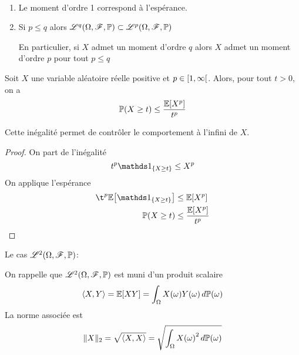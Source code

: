 \begin{remark}\,
    \begin{enumerate}
        \item Le moment d'ordre 1 correspond à l'espérance.

        \item Si \(p\leq q\) alors \(\mathscr{L}^q(\Omega, \mathscr{F}, \mathbb{P})\subset \mathscr{L}^p(\Omega, \mathscr{F}, \mathbb{P})\)

        En particulier, si \(X\) admet un moment d'ordre \(q\) alors \(X\) admet un moment
        d'ordre \(p\) pour tout \(p\leq q\)
    \end{enumerate}
\end{remark}

\begin{proposition}
    Soit \(X\) une variable aléatoire réelle positive et
    \(p\in\mathopen{}\left[1,\infty\right[\mathclose{}\). Alors, pour tout \(t> 0\), on a
    \begin{equation*}
        \mathbb{P}(X\geq t) \leq \frac{\mathbb{E}\mathopen{}\left[X^p\right]\mathclose{}}{t^p}
    \end{equation*}

    Cette inégalité permet de contrôler le comportement à l'infini
    de \(X\).
\end{proposition}

\begin{proof}
    On part de l'inégalité
    \begin{equation*}
        t^p\one_{\{X\geq t\}}\leq X^p
    \end{equation*}
    On applique l'espérance
    \begin{equation*}
        \begin{aligned}
            \t^p\bb E\ff{\one_{\{X\geq t\}}}&\leq \bb E\ff{X^p}\\
            \bb P(X\geq t)&\leq \frac{\bb E\ff{X^p}}{t^p}
        \end{aligned}
    \end{equation*}
\end{proof}


Le cas \(\mathscr{L}^2(\Omega, \mathscr{F}, \mathbb{P})\):

On rappelle que \(\mathscr{L}^2(\Omega, \mathscr{F}, \mathbb{P})\) est muni d'un
produit scalaire
\begin{equation*}
    \langle X,Y\rangle = \mathbb{E}\mathopen{}\left[XY\right]\mathclose{} = \int_{\Omega} X(\omega)Y(\omega)\mathop{}\!{d}\mathbb{P}(\omega)
\end{equation*}
La norme associée est
\begin{equation*}
    \mathopen{}\left\|X\right\|\mathclose{}_2 = \sqrt{\langle X, X\rangle} = \sqrt{\int_{\Omega}{X(\omega)}^2\mathop{}\!{d}\mathbb{P}(\omega)}
\end{equation*}

